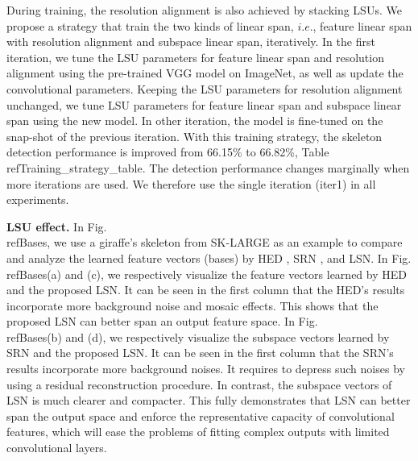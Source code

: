 \documentclass[runningheads]{llncs}
\begin{document}
During training, the resolution alignment is also achieved by stacking LSUs.
We propose a strategy that train the two kinds of linear span, $i.e.$, feature linear span with resolution alignment and subspace linear span, iteratively. In the first iteration, we tune the LSU parameters for feature linear span and resolution alignment using the pre-trained VGG model on ImageNet, as well as update the convolutional parameters. Keeping the LSU parameters for resolution alignment unchanged, we tune LSU parameters for feature linear span and subspace linear span using the new model. In other iteration, the model is fine-tuned on the snap-shot of the previous iteration. With this training strategy, the skeleton detection performance is improved from 66.15\% to 66.82\%, Table\\ref{Training_strategy_table}. The detection performance changes marginally when more iterations are used. We therefore use the single iteration (iter1) in all experiments.



\textbf{LSU effect.}
In Fig.\\ref{Bases}, we use a giraffe's skeleton from SK-LARGE as an example to compare and analyze the learned feature vectors (bases) by HED \cite{ref6}, SRN \cite{ref6}, and LSN. In Fig.\\ref{Bases}(a) and (c), we respectively visualize the feature vectors learned by HED \cite{ref6} and the proposed LSN. It can be seen in the first column that the HED's results incorporate more background noise and mosaic effects. This shows that the proposed LSN can better span an output feature space. In Fig.\\ref{Bases}(b) and (d), we respectively visualize the subspace vectors learned by SRN \cite{ref1} and the proposed LSN. It can be seen in the first column that the SRN's results incorporate more background noises. It requires to depress such noises by using a residual reconstruction procedure. In contrast, the subspace vectors of LSN is much clearer and compacter. This fully demonstrates that LSN can better span the output space and enforce the representative capacity of convolutional features, which will ease the problems of fitting complex outputs with limited convolutional layers. 
\end{document}
